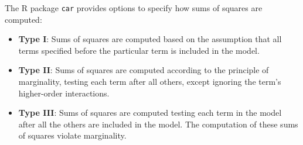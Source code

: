 \documentclass[
]{book}
\begin{document}
The R package \texttt{car} provides options to specify how sums of squares are computed:

\begin{itemize}
\item
  \textbf{Type I}: Sums of squares are computed based on the assumption that all terms specified before the particular term is included in the model.
\item
  \textbf{Type II}: Sums of squares are computed according to the principle of marginality, testing each term after all others, except ignoring the term's higher-order interactions.
\item
  \textbf{Type III}: Sums of squares are computed testing each term in the model after all the others are included in the model. The computation of these sums of squares violate marginality.
\end{itemize}
\end{document}
